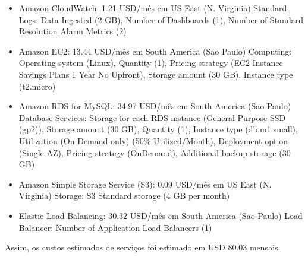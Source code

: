 \documentclass[
    12pt,               %
    openright,          %
    oneside,
    a4paper,            %
    BIBLATEX,           %
    TODO,               %
    english,            %
    brazil              %
    ]{ifsp-spo-inf-ctds}
\providecommand{\DIFaddbegin}{} %
\providecommand{\DIFaddend}{} %
\newcommand{\DIFaddincludegraphics}[2][]{{\color{blue}\fbox{\DIFOincludegraphics[#1]{#2}}}} %
\DeclareRobustCommand{\DIFaddbegin}{\DIFOaddbegin \let\includegraphics\DIFaddincludegraphics} %
\DeclareRobustCommand{\DIFaddend}{\DIFOaddend \let\includegraphics\DIFOincludegraphics} %
\begin{document}
            \begin{itemize}
            \DIFaddbegin 

                \DIFaddend \item Amazon CloudWatch: 1.21 USD/mês em US East (N. Virginia) Standard Logs: Data Ingested (2 GB), Number of Dashboards (1), Number of Standard Resolution Alarm Metrics (2)
                \DIFaddbegin 

                \DIFaddend \item Amazon EC2: 13.44 USD/mês em South America (Sao Paulo) Computing: Operating system (Linux), Quantity (1), Pricing strategy (EC2 Instance Savings Plans 1 Year No Upfront), Storage amount (30 GB), Instance type (t2.micro)
                \DIFaddbegin 

                \DIFaddend \item Amazon RDS for MySQL: 34.97 USD/mês em South America (Sao Paulo) Database Services: Storage for each RDS instance (General Purpose SSD (gp2)), Storage amount (30 GB), Quantity (1), Instance type (db.m1.small), Utilization (On-Demand only) (50\% Utilized/Month), Deployment option (Single-AZ), Pricing strategy (OnDemand), Additional backup storage (30 GB)
                \DIFaddbegin 

                \DIFaddend \item Amazon Simple Storage Service (S3): 0.09 USD/mês em US East (N. Virginia) Storage: S3 Standard storage (4 GB per month)
                \DIFaddbegin 

                \DIFaddend \item Elastic Load Balancing: 30.32 USD/mês em South America (Sao Paulo) Load Balancer: Number of Application Load Balancers (1)
                \DIFaddbegin 

            \DIFaddend \end{itemize}

    
            Assim, os custos estimados de serviços foi estimado em USD 80.03 mensais.
\end{document}

